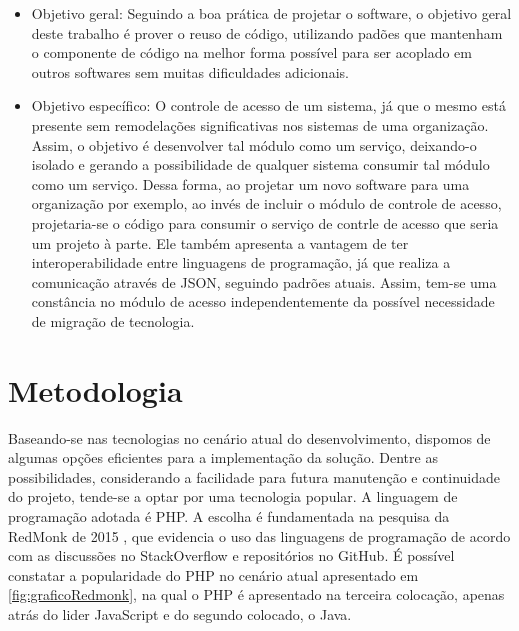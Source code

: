 \begin{itemize}
	\item Objetivo geral: Seguindo a boa prática de projetar o software, o objetivo geral deste trabalho é prover o reuso de código, utilizando padões que mantenham o componente de código na melhor forma possível para ser acoplado em outros softwares sem muitas dificuldades adicionais.
	\item Objetivo específico: O controle de acesso de um sistema, já que o mesmo está presente sem remodelações significativas nos sistemas de uma organização. Assim, o objetivo é desenvolver tal módulo como um serviço, deixando-o isolado e gerando a possibilidade de qualquer sistema consumir tal módulo como um serviço. Dessa forma, ao projetar um novo software para uma organização por exemplo, ao invés de incluir o módulo de controle de acesso, projetaria-se o código para consumir o serviço de contrle de acesso que seria um projeto à parte. Ele também apresenta a vantagem de ter interoperabilidade entre linguagens de programação, já que realiza a comunicação através de JSON, seguindo padrões atuais. Assim, tem-se uma constância no módulo de acesso independentemente da possível necessidade de migração de tecnologia.
\end{itemize}


\section{Metodologia} %


Baseando-se nas tecnologias no cenário atual do desenvolvimento, dispomos de algumas opções eficientes para a implementação da solução. Dentre as possibilidades, considerando a facilidade para futura manutenção e continuidade do projeto, tende-se a optar por uma tecnologia popular. A linguagem de programação adotada é PHP. A escolha é fundamentada na pesquisa da RedMonk de 2015 \cite{Grafico-RedMonk} , que evidencia o uso das linguagens de programação de acordo com as discussões no StackOverflow e repositórios no GitHub. É possível constatar a popularidade do PHP no cenário atual apresentado em \ref{fig:graficoRedmonk}, na qual o PHP é apresentado na terceira colocação, apenas atrás do lider JavaScript e do segundo colocado, o Java.


